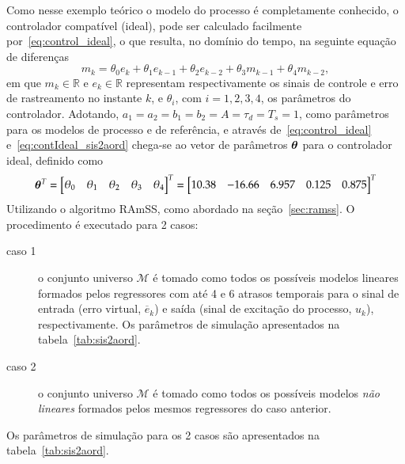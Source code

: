 \begin{exmp}
    Como nesse exemplo teórico o modelo do processo é completamente conhecido, o controlador compatível (ideal), pode ser calculado facilmente por~\ref{eq:control_ideal}, o que resulta, no domínio do tempo, na seguinte equação de diferenças
    \begin{equation}
    \label{eq:contIdeal_sis2aord}
        m_k = \theta_0e_{k} + \theta_1e_{k-1} + \theta_2e_{k-2} + \theta_3m_{k-1} + \theta_4m_{k-2},
    \end{equation}
    em que $m_k \in \mathbb{R}$ e $e_k \in \mathbb{R}$ representam respectivamente os sinais de controle e erro de rastreamento no instante $k$, e $\theta_i$, com $i=1,2,3,4$, os parâmetros do controlador.
    Adotando, $ a_1 = a_2 = b_1 = b_2 = A = \tau_d = T_s = 1$,
     como parâmetros para os modelos de processo e de referência, e através de~\eqref{eq:control_ideal} e~\eqref{eq:contIdeal_sis2aord} chega-se ao vetor de parâmetros $\bm{\theta}$ para o controlador ideal, definido como
 \begin{equation}
     \bm{\theta}^T = \begin{bmatrix} \theta_0 & \theta_1 & \theta_2 & \theta_3 & \theta_4 \end{bmatrix}^T =  \begin{bmatrix} 
      10.38 & -16.66 & 6.957 & 0.125 & 0.875 \end{bmatrix}^T
    \label{eq:}
    \end{equation}
    Utilizando o algoritmo RAmSS, como abordado na seção~\ref{sec:ramss}.
    O procedimento é executado para 2 casos:
    \begin{description}
        \item[caso 1] o conjunto universo $\mathscr{M}$ é tomado como todos os possíveis modelos lineares formados pelos regressores com até 4 e 6 atrasos temporais para o sinal de entrada (erro virtual, $\overline{e}_k$) e saída (sinal de excitação do processo, $u_k$), respectivamente. Os parâmetros de simulação apresentados na tabela~\ref{tab:sis2aord}. 
        \item[caso 2] o conjunto universo $\mathscr{M}$ é tomado como todos os possíveis modelos \textit{não lineares} formados pelos mesmos regressores do caso anterior. 
    \end{description}
    Os parâmetros de simulação para os 2 casos são apresentados na tabela~\ref{tab:sis2aord}. 


\end{exmp}

